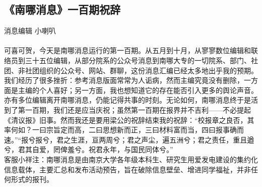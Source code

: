 \documentclass[letterpaper, 12pt]{article}
\begin{document}
\begin{multicols}{2}
\section{《南哪消息》一百期祝辞}
消息编辑 小喇叭\\\\
可喜可贺，今天是南哪消息运行的第一百期。从五月到十月，从寥寥数位编辑和联络员到三十五位编辑，从部分院系的公众号消息到南哪大专的一切院系、部门、社团、非社团组织的公众号、网站、群聊，这份消息汇编已经太多地出乎我的预期。我们经历了很多挫折：参考消息版面常常为人诟病，然而主编究竟没有删除，一方面是主编的个人喜好；另一方面，我也想知道它的存在能否引入更多的舆论声音。亦有多位编辑离开南哪消息，仍能记得共事的时刻。无论如何，南哪消息终于是活到了第一百期，我们还是应当庆祝；虽然第一百期在报界并不吉利——不必提起《清议报》旧事。然而我还是要用梁公的祝辞结束我的祝辞：“校报章之良否，其率何如？一曰宗旨定而高，二曰思想新而正，三曰材料富而当，四曰报事确而速。”“报兮报兮，君之生涯，亘两周兮；君之声尘，遍五洲兮；君之责任，重且遒兮，君其自爱，罔俾羞兮。祝君永年，与国民同体兮。”\\

客服小祥注：南哪消息是由南京大学各年级本科生、研究生用爱发电建设的集约化信息载体，主要汇总和发布活动预告，旨在破除信息壁垒、增进同学福祉，并非任何形式的报刊。
\end{multicols} 
\end{document}
